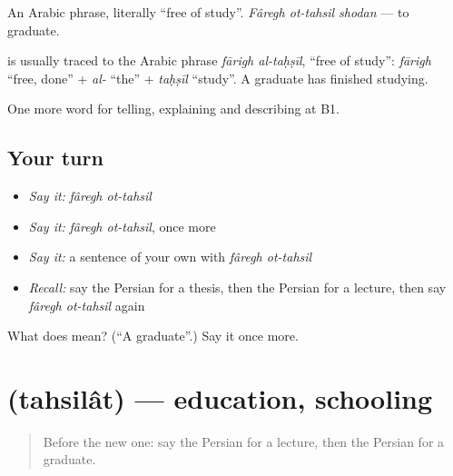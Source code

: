 An Arabic phrase, literally \textquotedblleft{}free of study\textquotedblright{}. \emph{Fâregh ot-tahsil shodan} — to graduate.

\begin{cousinweb}
\textbf{ } is usually traced to the Arabic phrase \emph{fārigh al-taḥṣīl}, \textquotedblleft{}free of study\textquotedblright{}: \emph{fārigh} \textquotedblleft{}free, done\textquotedblright{} + \emph{al-} \textquotedblleft{}the\textquotedblright{} + \emph{taḥṣīl} \textquotedblleft{}study\textquotedblright{}. A graduate has finished studying.
\end{cousinweb}

\begin{grammarlens}[title={What you've built}]
One more word for telling, explaining and describing at B1.
\end{grammarlens}

\subsection*{Your turn}
\begin{itemize}
\raggedright
  \item \emph{Say it:} \emph{fâregh ot-tahsil}
  \item \emph{Say it:} \emph{fâregh ot-tahsil}, once more
  \item \emph{Say it:} a sentence of your own with \emph{fâregh ot-tahsil}
  \item \emph{Recall:} say the Persian for a thesis, then the Persian for a lecture, then say \emph{fâregh ot-tahsil} again
\end{itemize}

\begin{tcolorbox}[breakable,colback=teal!4,colframe=teal!35!black,title={Before you move on}]
What does   mean? (\textquotedblleft{}A graduate\textquotedblright{}.) Say it once more.
\end{tcolorbox}
\section[\texorpdfstring{\fa{تحصیلات} (tahsilât)}{تحصیلات (tahsilât)}]{ (tahsilât) — education, schooling}

\label{lesson:FA-C403-tahsilat}



\begin{quote}
Before the new one: say the Persian for a lecture, then the Persian for a graduate.
\end{quote}


